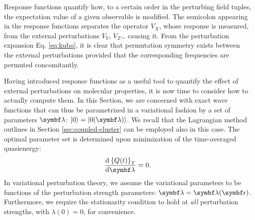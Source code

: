 Response functions quantify how, to a certain order in the perturbing
field tuples, the expectation value of a given observable is modified.
The semicolon appearing in the response functions separates the operator
$V_X$, whose response is measured, from the external perturbations
$V_Y$, $V_Z$\dots{} causing it.
From the perturbation expansion Eq. \eqref{eq:kubo}, it is clear that
permutation symmetry exists between the external perturbations provided
that the corresponding frequencies are permuted concomitantly.

Having introduced response functions as a useful tool to quantify the
effect of external perturbations on molecular properties, it is now time
to consider how to actually compute them.
In this Section, we are concerned with exact wave functions that can
thus be parametrized in a variational fashion by a set of parameters
$\vect{\lambda}$: $\ket{0}=\ket{0(\vect{\lambda})}$.
We recall that the Lagrangian method outlines in Section
\ref{sec:coupled-cluster} can be employed also in this
case.\autocite{Christiansen1998-pe, Helgaker2012-cz, Pawlowski2015-sq}
The optimal parameter set is determined upon minimization of the
time-averaged quasienergy:
\begin{equation}\label{eq:var-cond}
 \deriv{\aveQ}{\vect{\lambda}} = 0.
\end{equation}
In variational perturbation theory,\autocite{Helgaker1992-ph,
Saue2002-ns} we assume the variational parameters to be functions of the
perturbation strength parameters: $\vect{\lambda} =
\vect{\lambda}(\vect{\epsilon})$.
Furthermore, we require the stationarity condition to hold at \emph{all}
perturbation strengths, with $\lambda(0) = 0$, for convenience.


